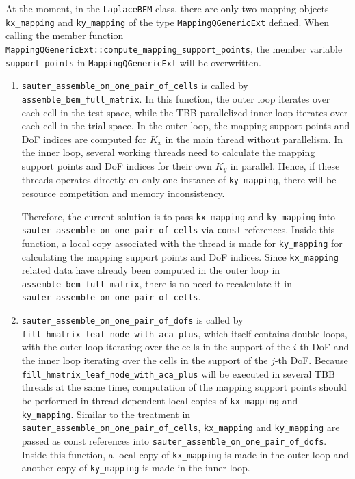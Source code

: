 \documentclass[11pt, a4paper]{article}
\begin{document}
At the moment, in the \texttt{LaplaceBEM} class, there are only two mapping objects \texttt{kx\_mapping} and \texttt{ky\_mapping} of the type \texttt{MappingQGenericExt} defined. When calling the member function \texttt{MappingQGenericExt::compute\_mapping\_support\_points}, the member variable \texttt{support\_points} in \texttt{MappingQGenericExt} will be overwritten.

\begin{enumerate}
\item \texttt{sauter\_assemble\_on\_one\_pair\_of\_cells} is called by \texttt{assemble\_bem\_full\_matrix}. In this function, the outer loop iterates over each cell in the test space, while the TBB parallelized inner loop iterates over each cell in the trial space. In the outer loop, the mapping support points and DoF indices are computed for \(K_x\) in the main thread without parallelism. In the inner loop, several working threads need to calculate the mapping support points and DoF indices for their own \(K_y\) in parallel. Hence, if these threads operates directly on only one instance of \texttt{ky\_mapping}, there will be resource competition and memory inconsistency.

Therefore, the current solution is to pass \texttt{kx\_mapping} and \texttt{ky\_mapping} into \texttt{sauter\_assemble\_on\_one\_pair\_of\_cells} via \texttt{const} references. Inside this function, a local copy associated with the thread is made for \texttt{ky\_mapping} for calculating the mapping support points and DoF indices. Since \texttt{kx\_mapping} related data have already been computed in the outer loop in \texttt{assemble\_bem\_full\_matrix}, there is no need to recalculate it in \texttt{sauter\_assemble\_on\_one\_pair\_of\_cells}.

\item \texttt{sauter\_assemble\_on\_one\_pair\_of\_dofs} is called by \texttt{fill\_hmatrix\_leaf\_node\_with\_aca\_plus}, which itself contains double loops, with the outer loop iterating over the cells in the support of the \(i\)-th DoF and the inner loop iterating over the cells in the support of the \(j\)-th DoF. Because \texttt{fill\_hmatrix\_leaf\_node\_with\_aca\_plus} will be executed in several TBB threads at the same time, computation of the mapping support points should be performed in thread dependent local copies of \texttt{kx\_mapping} and \texttt{ky\_mapping}. Similar to the treatment in \texttt{sauter\_assemble\_on\_one\_pair\_of\_cells}, \texttt{kx\_mapping} and \texttt{ky\_mapping} are passed as const references into \texttt{sauter\_assemble\_on\_one\_pair\_of\_dofs}. Inside this function, a local copy of \texttt{kx\_mapping} is made in the outer loop and another copy of \texttt{ky\_mapping} is made in the inner loop.
\end{enumerate}
\end{document}

